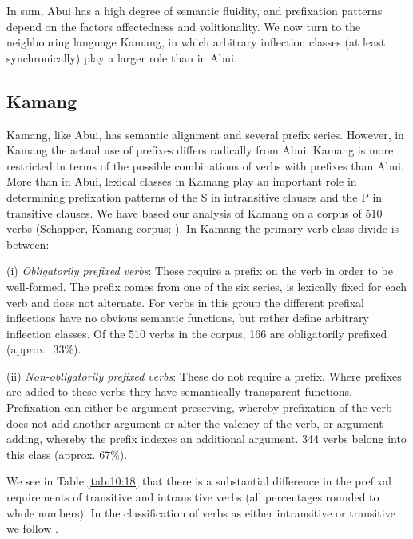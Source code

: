 In sum, Abui has a high degree of semantic fluidity, and prefixation patterns depend on the factors affectedness and volitionality. We now turn to the neighbouring language Kamang, in which arbitrary inflection classes (at least synchronically) play a larger role than in Abui.
 

\subsection{Kamang}

\label{sec:10:5.2}
Kamang, like Abui, has semantic alignment and several prefix series. However, in Kamang the actual use of prefixes differs radically from Abui. Kamang is more restricted in terms of the possible combinations of verbs with prefixes than Abui. More than in Abui, lexical classes in Kamang play an important role in determining prefixation patterns of the S in intransitive clauses and the P in transitive clauses. We have based our analysis of Kamang on a corpus of 510 verbs (Schapper, Kamang corpus; \citet{SchapperEtAl2011kamus}). In Kamang the primary verb class divide is between:
\newpage

(i)  \textit{Obligatorily prefixed verbs}: These require a prefix on the verb in order to be well-formed. The prefix comes from one of the six series, is lexically fixed for each verb and does not alternate. For verbs in this group the different prefixal inflections have no obvious semantic functions, but rather define arbitrary inflection classes. Of the 510 verbs in the corpus, 166 are obligatorily prefixed (approx.~33\%).

(ii) \textit{Non-obligatorily prefixed verbs}: These do not require a prefix. Where prefixes are added to these verbs they have semantically transparent functions. Prefixation can either be argument-preserving, whereby prefixation of the verb does not add another argument or alter the valency of the verb, or argument-adding, whereby the prefix indexes an additional argument. 344 verbs belong into this class (approx. 67\%).

We see in Table \ref{tab:10:18} that there is a substantial difference in the prefixal requirements of transitive and intransitive verbs (all percentages rounded to whole numbers). In the classification of verbs as either intransitive or transitive we follow \citet{SchapperEtAl2011kamus}.

